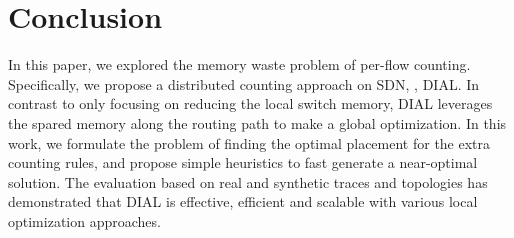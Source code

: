 \section{Conclusion}\label{sec:con}
In this paper, we explored the memory waste problem of per-flow counting.
Specifically, we propose a distributed counting approach on SDN, \ie, DIAL.
In contrast to only focusing on reducing the local switch memory, DIAL leverages the spared memory along the routing path to make a global optimization.
In this work, we formulate the problem of finding the optimal placement for the extra counting rules, and propose simple heuristics to fast generate a near-optimal solution.
The evaluation based on real and synthetic traces and topologies has demonstrated that DIAL is effective, efficient and scalable with various local optimization approaches.
